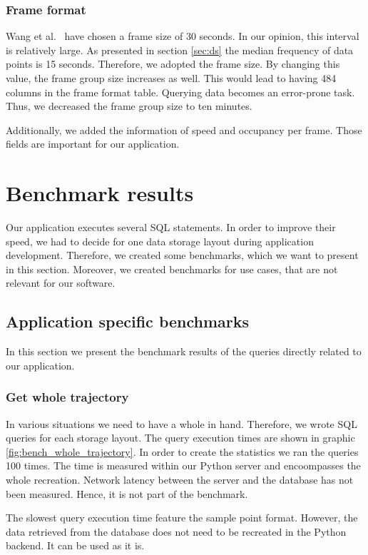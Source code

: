 \documentclass[10pt]{sig-alternate}
\begin{document}
\subsubsection{Frame format}
Wang et al.~\cite{wang} have chosen a frame size of 30 seconds. In our opinion, this interval is relatively large. As presented in section \ref{sec:ds} the median frequency of data points is 15 seconds. Therefore, we adopted the frame size. By changing this value, the frame group size increases as well. This would lead to having 484 columns in the frame format table. Querying data becomes an error-prone task. Thus, we decreased the frame group size to ten minutes.

Additionally, we added the information of speed and occupancy per frame. Those fields are important for our application.

\section{Benchmark results}
Our application executes several SQL statements. In order to improve their speed, we had to decide for one data storage layout during application development. Therefore, we created some benchmarks, which we want to present in this section. Moreover, we created benchmarks for use cases, that are not relevant for our software.

\subsection{Application specific benchmarks}
In this section we present the benchmark results of the queries directly related to our application.

\subsubsection{Get whole trajectory}
In various situations we need to have a whole in hand. Therefore, we wrote SQL queries for each storage layout. The query execution times are shown in graphic \ref{fig:bench_whole_trajectory}. In order to create the statistics we ran the queries 100 times. The time is measured within our Python server and encoompasses the whole recreation. Network latency between the server and the database has not been measured. Hence, it is not part of the benchmark.

The slowest query execution time feature the sample point format. However, the data retrieved from the database does not need to be recreated in the Python backend. It can be used as it is.
\end{document}

